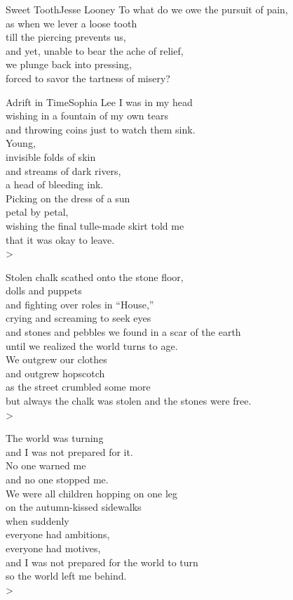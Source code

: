 \begin{poetry}{Sweet Tooth}{Jesse Looney}
To what do we owe the pursuit of pain,\\
as when we lever a loose tooth\\
till the piercing prevents us,\\
and yet, unable to bear the ache of relief,\\
we plunge back into pressing,\\
forced to savor the tartness of misery?
\end{poetry}


\begin{poetry}{Adrift in Time}{Sophia Lee}
I was in my head\\
\tab{}wishing in a fountain of my own tears\\
and throwing coins just to watch them sink.\\
\tab{}Young,\\
invisible folds of skin\\
\tab{}and streams of dark rivers,\\
a head of bleeding ink.\\
\tab{}Picking on the dress of a sun \\
petal by petal,\\
\tab{}wishing the final tulle-made skirt told me\\
that it was okay to leave.\\>

Stolen chalk scathed onto the stone floor,\\
\tab{}dolls and puppets\\
and fighting over roles in “House,”\\
\tab{}crying and screaming to seek eyes\\
and stones and pebbles we found in a scar of the earth\\
\tab{}until we realized the world turns to age.\\
We outgrew our clothes\\
\tab{}and outgrew hopscotch\\
as the street crumbled some more\\
\tab{}but always the chalk was stolen and the stones were free.\\>

The world was turning\\
\tab{}and I was not prepared for it.\\
No one warned me\\
\tab{}and no one stopped me.\\
We were all children hopping on one leg\\
\tab{}on the autumn-kissed sidewalks\\
when suddenly\\
\tab{}everyone had ambitions,\\
everyone had motives,\\
\tab{}and I was not prepared for the world to turn\\
so the world left me behind.\\>


\end{poetry}
